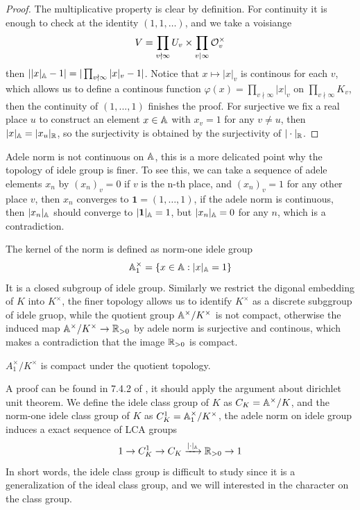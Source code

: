\begin{proof}
    The multiplicative property is clear by definition. For continuity it is enough to check at the identity \((1,1,\dots)\), and we take a voisiange
    \[V = \prod_{v \nmid \infty} U_v \times \prod_{v \mid \infty} \mathcal{O}_v^\times\]
    then \(||x|_{\mathbb{A}}-1| = |\prod_{v \nmid \infty}|x|_v - 1|\). Notice that \(x \mapsto |x|_v\) is continous for each \(v\), which allows us to define a continous function \(\varphi(x) = \prod_{v \nmid \infty} |x|_v\) on \(\prod_{v \nmid \infty}K_v\), then the continuity of \((1,...,1)\) finishes the proof. For surjective we fix a real place \(u\) to construct an element \(x \in \mathbb{A}\) with \(x_v = 1\) for any \(v \neq u\), then \(|x|_{\mathbb{A}} = |x_u|_{\mathbb{R}}\), so the surjectivity is obtained by the surjectivity of \(|\cdot|_{\mathbb{R}}\).
\end{proof}

\begin{remark}
    Adele norm is not continuous on \(\mathbb{A}\), this is a more delicated point why the topology of idele group is finer. To see this, we can take a sequence of adele elements \(x_n\) by \((x_n)_v = 0\) if \(v\) is the n-th place, and \((x_n)_v = 1\) for any other place \(v\), then \(x_n\) converges to \(\mathbf{1}=(1,\dots,1)\), if the adele norm is continuous, then \(|x_n|_{\mathbb{A}}\) should converge to \(|\mathbf{1}|_{\mathbb{A}} = 1\), but \(|x_n|_{\mathbb{A}} = 0\) for any \(n\), which is a contradiction.
\end{remark}

The kernel of the norm is defined as norm-one idele group 
\[\mathbb{A}_1^\times = \{x \in \mathbb{A}: |x|_{\mathbb{A}} = 1\}\]
It is a closed subgroup of idele group. Similarly we restrict the digonal embedding of \(K\) into \(K^\times\), the finer topology allows us to identify \(K^\times\) as a discrete subggroup of idele gruop, while the quotient group \(\mathbb{A}^\times/K^\times\) is not compact, otherwise the induced map \(\mathbb{A}^\times/K^\times \to \mathbb{R}_{>0}\) by adele norm is surjective and continous, which makes a contradiction that the image \(\mathbb{R}_{>0}  \) is compact.

\begin{lemma}
    \(A_1^\times/K^\times\) is compact under the quotient topology.
\end{lemma}

A proof can be found in 7.4.2 of \cite{koch2000number}, it should apply the argument about dirichlet unit theorem. We define the idele class group of \(K\) as \(C_K = \mathbb{A}^\times/K\), and the norm-one idele class group of \(K\) as \(C_K^1 = \mathbb{A}_1^\times/K^\times\), the adele norm on idele group induces a exact sequence of LCA groups
\[1 \to C_K^1 \to C_K \xrightarrow{|\cdot|_{\mathbb{A}}} \mathbb{R}_{>0} \to 1\]
In short words, the idele class group is difficult to study since it is a generalization of the ideal class group, and we will interested in the character on the class group.



